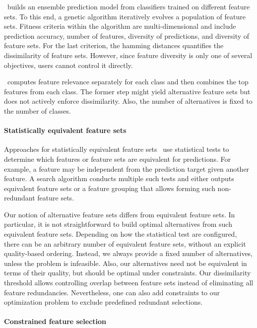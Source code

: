 \documentclass{article}
\theoremstyle{definition}
\begin{document}
\cite{liu2019subspace}~builds an ensemble prediction model from classifiers trained on different feature sets.
To this end, a genetic algorithm iteratively evolves a population of feature sets.
Fitness criteria within the algorithm are multi-dimensional and include prediction accuracy, number of features, diversity of predictions, and diversity of feature sets.
For the last criterion, the hamming distances quantifies the dissimilarity of feature sets.
However, since feature diversity is only one of several objectives, users cannot control it directly.

\cite{guru2018alternative}~computes feature relevance separately for each class and then combines the top features from each class.
The former step might yield alternative feature sets but does not actively enforce dissimilarity.
Also, the number of alternatives is fixed to the number of classes.

\paragraph{Statistically equivalent feature sets}

Approaches for statistically equivalent feature sets~\cite{borboudakis2021extending, lagani2017feature} use statistical tests to determine which features or feature sets are equivalent for predictions.
For example, a feature may be independent from the prediction target given another feature.
A search algorithm conducts multiple such tests and either outputs equivalent feature sets or a feature grouping that allows forming such non-redundant feature sets.

Our notion of alternative feature sets differs from equivalent feature sets.
In particular, it is not straightforward to build optimal alternatives from such equivalent feature sets.
Depending on how the statistical test are configured, there can be an arbitrary number of equivalent feature sets, without an explicit quality-based ordering.
Instead, we always provide a fixed number of alternatives, unless the problem is infeasible.
Also, our alternatives need not be equivalent in terms of their quality, but should be optimal under constraints.
Our dissimilarity threshold allows controlling overlap between feature sets instead of eliminating all feature redundancies.
Nevertheless, one can also add constraints to our optimization problem to exclude predefined redundant selections.

\paragraph{Constrained feature selection}
\end{document}
